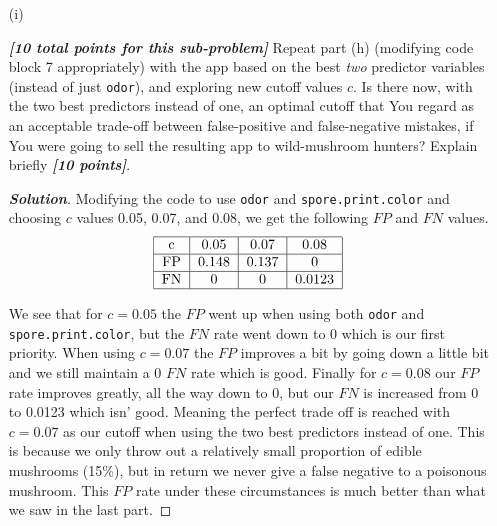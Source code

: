 \documentclass[12pt]{article}
\newenvironment{solution}{\begin{tcolorbox}[breakable]\begin{proof}[\textbf{\textit{Solution}}] }{\end{proof}\end{tcolorbox}}
\newcommand{\bi}[1]{\textbf{\textit{#1}}}
\begin{document}
\begin{itemize}
\begin{solution}
    When considering the real world implications for the $FP$ and $FN$ rates, the $0.05$ cutoff is not acceptable. This is because 3 percent of edible mushrooms will actually be poisonous, meaning one would eat said mushroom and face lethal effects. So while the $0.05$ cut-off won't ever suggest avoiding an edible mushroom, it at times will suggest taking a poisonous mushroom. 

    On the other hand we see $0.01$ cutoff value will be perfect. This is because even though most of the mushrooms it will label as poisonous are edible, it will label a poisonous mushroom negative. Meaning no one under this cutoff value will eat a poisonous mushroom which is the number one priority with our predictions. 
\end{solution}

\item[(i)]

\bi{[10 total points for this sub-problem]} Repeat part (h) (modifying code block 7 appropriately) with the app based on the best \textit{two} predictor variables (instead of just \texttt{odor}), and exploring new cutoff values $c$. Is there now, with the two best predictors instead of one, an optimal cutoff that You regard as an acceptable trade-off between false-positive and false-negative mistakes, if You were going to sell the resulting app to wild-mushroom hunters? Explain briefly \bi{[10 points]}.

\begin{solution}
    Modifying the code to use \texttt{odor} and \texttt{spore.print.color} and choosing $c$ values 0.05, 0.07, and 0.08, we get the following $FP$ and $FN$ values. 
    \[
    \begin{tabular}{| c | c | c | c | }
        \hline
        c & 0.05 & 0.07 & 0.08 \\
        \hline
        FP & 0.148 &0.137 & 0\\
        \hline
        FN &0  & 0  & 0.0123 \\
        \hline
    \end{tabular} \]

    We see that for $c = 0.05$ the $FP$ went up when using both \texttt{odor} and \texttt{spore.print.color}, but the $FN$ rate went down to 0 which is our first priority. When using $c = 0.07$ the $FP$ improves a bit by going down a little bit and we still maintain a 0 $FN$ rate which is good. Finally for $c = 0.08$ our $FP$ rate improves greatly, all the way down to 0, but our $FN$ is increased from 0 to 0.0123 which isn' good. Meaning the perfect trade off is reached with $c = 0.07$ as our cutoff when using the two best predictors instead of one. This is because we only throw out a relatively small proportion of edible mushrooms (15\%), but in return we never give a false negative to a poisonous mushroom. This $FP$ rate under these circumstances is much better than what we saw in the last part. 
\end{solution}


\end{itemize}
\end{document}
